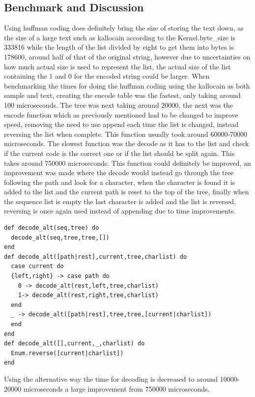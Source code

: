 \documentclass[a4paper,11pt]{article}
\begin{document}
\subsection*{Benchmark and Discussion}
Using huffman coding does definitely bring the size of storing the text down, as the size of a large text such as kallocain according to the Kernel.byte\_size is 333816 while the length of the list divided by eight to get them into bytes is 178600, around half of that of the original string, however due to uncertainties on how much actual size is used to represent the list, the actual size of the list containing the 1 and 0 for the encoded string could be larger. 
When benchmarking the times for doing the huffman coding using the kallocain as both sample and text, creating the encode table was the fastest, only taking around 100 microseconds. The tree was next taking around 20000, the next was the encode function which as previously mentioned had to be changed to improve speed, removing the need to use append each time the list is changed, instead reversing the list when complete. This function usually took around 60000-70000 microseconds. The slowest function was the decode as it has to the list and check if the current code is the correct one or if the list should be split again. This takes around 750000 microseconds. This function could definitely be improved, an improvement was made where the decode would instead go through the tree following the path and look for a character, when the character is found it is added to the list and the current path is reset to the top of the tree, finally when the sequence list is empty the last character is added and the list is reversed, reversing is once again used instead of appending due to time improvements. 
\begin{verbatim}
def decode_alt(seq,tree) do
  decode_alt(seq,tree,tree,[])
end
def decode_alt([path|rest],current,tree,charlist) do
  case current do
  {left,right} -> case path do
    0 -> decode_alt(rest,left,tree,charlist)
    1-> decode_alt(rest,right,tree,charlist)
  end
  _ -> decode_alt([path|rest],tree,tree,[current|charlist])
  end
end
def decode_alt([],current,_,charlist) do
  Enum.reverse([current|charlist])
end
\end{verbatim} 
Using the alternative way the time for decoding is decreased to around 10000-20000 microseconds a large improvement from 750000 microseconds.
\end{document}
